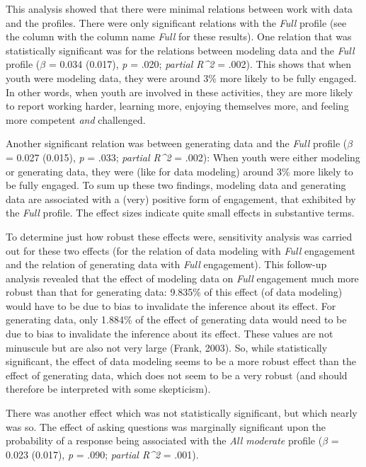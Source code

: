 \documentclass[]{msu-thesis}
\theoremstyle{definition}
\theoremstyle{definition}
\theoremstyle{definition}
\theoremstyle{remark}
\begin{document}
This analysis showed that there were minimal relations between work with
data and the profiles. There were only significant relations with the
\emph{Full} profile (see the column with the column name \emph{Full} for
these results). One relation that was statistically significant was for
the relations between modeling data and the \emph{Full} profile
(\(\beta\) = 0.034 (0.017), \emph{p} = .020; \emph{partial R\^{}2} =
.002). This shows that when youth were modeling data, they were around
3\% more likely to be fully engaged. In other words, when youth are
involved in these activities, they are more likely to report working
harder, learning more, enjoying themselves more, and feeling more
competent \emph{and} challenged.

Another significant relation was between generating data and the
\emph{Full} profile (\(\beta\) = 0.027 (0.015), \emph{p} = .033;
\emph{partial R\^{}2} = .002): When youth were either modeling or
generating data, they were (like for data modeling) around 3\% more
likely to be fully engaged. To sum up these two findings, modeling data
and generating data are associated with a (very) positive form of
engagement, that exhibited by the \emph{Full} profile. The effect sizes
indicate quite small effects in substantive terms.

To determine just how robust these effects were, sensitivity analysis
was carried out for these two effects (for the relation of data modeling
with \emph{Full} engagement and the relation of generating data with
\emph{Full} engagement). This follow-up analysis revealed that the
effect of modeling data on \emph{Full} engagement much more robust than
that for generating data: 9.835\% of this effect (of data modeling)
would have to be due to bias to invalidate the inference about its
effect. For generating data, only 1.884\% of the effect of generating
data would need to be due to bias to invalidate the inference about its
effect. These values are not minuscule but are also not very large
(Frank, 2003). So, while statistically significant, the effect of data
modeling seems to be a more robust effect than the effect of generating
data, which does not seem to be a very robust (and should therefore be
interpreted with some skepticism).

There was another effect which was not statistically significant, but
which nearly was so. The effect of asking questions was marginally
significant upon the probability of a response being associated with the
\emph{All moderate} profile (\(\beta\) = 0.023 (0.017), \emph{p} = .090;
\emph{partial R\^{}2} = .001).
\end{document}
